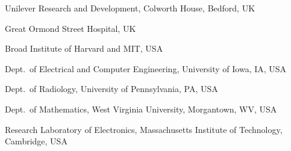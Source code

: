 {\begin{trivlist}
\item Unilever Research and Development, Colworth House, Bedford, UK
\item Great Ormond Street Hospital, UK
\item Broad Institute of Harvard and MIT, USA
\item Dept.~of Electrical and Computer Engineering, University of Iowa, IA, USA
\item Dept.~of Radiology, University of Pennsylvania, PA, USA
\item Dept.~of Mathematics, West Virginia University, Morgantown, WV, USA
\item Research Laboratory of Electronics, Massachusetts Institute of Technology, Cambridge, USA
\end{trivlist}
}

\addtolength\textheight{1ex}
